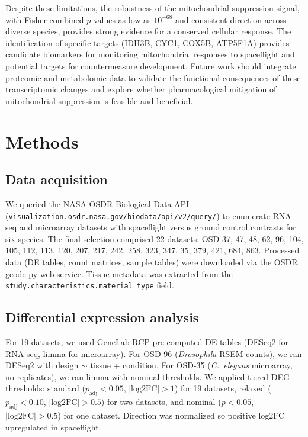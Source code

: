\documentclass[pdflatex,sn-nature]{sn-jnl}
\begin{document}
Despite these limitations, the robustness of the mitochondrial suppression signal,
with Fisher combined \(p\)-values as low as \(10^{-68}\) and consistent direction
across diverse species, provides strong evidence for a conserved cellular
response. The identification of specific targets (IDH3B, CYC1, COX5B, ATP5F1A)
provides candidate biomarkers for monitoring mitochondrial responses to
spaceflight and potential targets for countermeasure development. Future work
should integrate proteomic and metabolomic data to validate the functional
consequences of these transcriptomic changes and explore whether pharmacological
mitigation of mitochondrial suppression is feasible and beneficial.

\section{Methods}\label{sec:methods}

\subsection{Data acquisition}
We queried the NASA OSDR Biological Data API
(\texttt{visualization.osdr.nasa.gov/biodata/api/v2/query/}) to enumerate RNA-seq
and microarray datasets with spaceflight versus ground control contrasts for six
species. The final selection comprised 22 datasets: OSD-37, 47, 48, 62, 96, 104,
105, 112, 113, 120, 207, 217, 242, 258, 323, 347, 35, 379, 421, 684, 863.
Processed data (DE tables, count matrices, sample tables) were downloaded via the
OSDR geode-py web service. Tissue metadata was extracted from the
\texttt{study.characteristics.material type} field.

\subsection{Differential expression analysis}
For 19 datasets, we used GeneLab RCP pre-computed DE tables (DESeq2
\cite{love2014} for RNA-seq, limma \cite{ritchie2015} for microarray). For OSD-96
(\textit{Drosophila} RSEM counts), we ran DESeq2 with design \(\sim\) tissue +
condition. For OSD-35 (\textit{C.\ elegans} microarray, no replicates), we ran
limma with nominal thresholds. We applied tiered DEG thresholds: standard
(\(p_{\mathrm{adj}} < 0.05\), \(|\text{log2FC}| > 1\)) for 19 datasets, relaxed
(\(p_{\mathrm{adj}} < 0.10\), \(|\text{log2FC}| > 0.5\)) for two datasets, and
nominal (\(p < 0.05\), \(|\text{log2FC}| > 0.5\)) for one dataset. Direction was
normalized so positive log2FC = upregulated in spaceflight.
\end{document}
